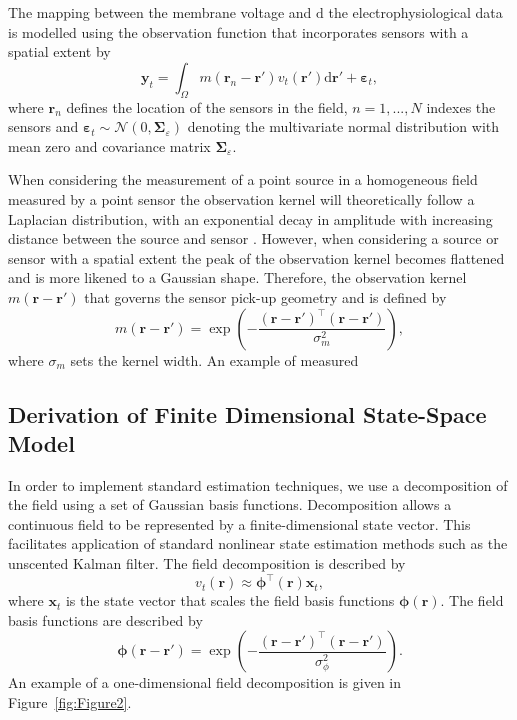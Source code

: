 \documentclass[12pt]{iopart}
\begin{document}
The mapping between the membrane voltage and $\textrm{d}$ the electrophysiological data is modelled using the observation function that incorporates sensors with a spatial extent by
\begin{equation}
    \label{eq:ObservationEquation}
	\mathbf{y}_t =
	\int_{\Omega}{
	    m\left(\mathbf{r}_n-\mathbf{r}'\right)v_t\left(\mathbf{r}'\right)
	\textrm{d}\mathbf{r}'} + 
	\boldsymbol{\varepsilon}_t, 
\end{equation}
where $\mathbf{r}_n$ defines the location of the sensors in the field, $n=1,...,N$ indexes the sensors and $\boldsymbol{\varepsilon}_t \sim \mathcal{N}\left(0,\boldsymbol{\Sigma}_{\varepsilon}\right)$ denoting the multivariate normal distribution with mean zero and covariance matrix $\boldsymbol{\Sigma}_{\varepsilon}$. 

When considering the measurement of a point source in a homogeneous field measured by a point sensor the observation kernel will theoretically follow a Laplacian distribution, with an exponential decay in amplitude with increasing distance between the source and sensor . However, when considering a source or sensor with a spatial extent the peak of the observation kernel becomes flattened and is more likened to a Gaussian shape. Therefore, the observation kernel $m(\mathbf{r}-\mathbf{r}')$ that governs the sensor pick-up geometry and is defined by 
\begin{equation}
	m\left(\mathbf{r}-\mathbf{r}'\right) = \exp{\left(-\frac{(\mathbf{r}-\mathbf{r}')^\top(\mathbf{r}-\mathbf{r}')}{\sigma_m^2}\right)},
\end{equation}
where $\sigma_m$ sets the kernel width. An example of measured 

\subsection{Derivation of Finite Dimensional State-Space Model}\label{Sect:ReducedModelDerivation}
In order to implement standard estimation techniques, we use a decomposition of the field using a set of Gaussian basis functions. Decomposition allows a continuous field to be represented by a finite-dimensional state vector. This facilitates application of standard nonlinear state estimation methods such as the unscented Kalman filter. The field decomposition is described by 
\begin{equation}
	\label{DefFieldDecomp} v_t\left(\mathbf{r}\right) \approx \boldsymbol{\phi}^{\top}\left(\mathbf{r}\right) \mathbf{x}_t, 
\end{equation}
where $\mathbf{x}_t$ is the state vector that scales the field basis functions $\mathbf{\boldsymbol{\phi}}(\mathbf{r})$. The field basis functions are described by
\begin{equation}\label{eq:FieldBasisFunction}
	\boldsymbol\phi\left(\mathbf{r}-\mathbf{r}'\right) =
\exp{\left(-\frac{(\mathbf{r}-\mathbf{r}')^\top(\mathbf{r}-\mathbf{r}')}{\sigma_{\phi}^2}\right)}. 
\end{equation}
An example of a one-dimensional field decomposition is given in Figure~\ref{fig:Figure2}.
\end{document}
